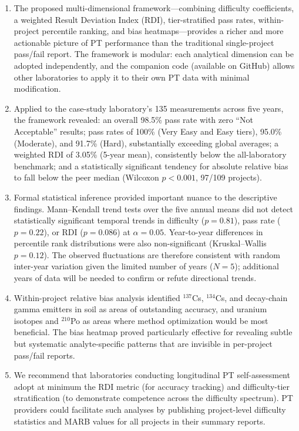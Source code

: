 \documentclass[12pt,a4paper,twoside]{article}
\begin{document}
\begin{enumerate}[nosep,label=(\arabic*)]
  \item The proposed multi-dimensional framework---combining difficulty coefficients, a weighted Result Deviation Index (RDI), tier-stratified pass rates, within-project percentile ranking, and bias heatmaps---provides a richer and more actionable picture of PT performance than the traditional single-project pass/fail report. The framework is modular: each analytical dimension can be adopted independently, and the companion code (available on GitHub) allows other laboratories to apply it to their own PT data with minimal modification.
  \item Applied to the case-study laboratory's 135 measurements across five years, the framework revealed: an overall 98.5\% pass rate with zero ``Not Acceptable'' results; pass rates of 100\% (Very Easy and Easy tiers), 95.0\% (Moderate), and 91.7\% (Hard), substantially exceeding global averages; a weighted RDI of 3.05\% (5-year mean), consistently below the all-laboratory benchmark; and a statistically significant tendency for absolute relative bias to fall below the peer median (Wilcoxon $p < 0.001$, 97/109 projects).
  \item Formal statistical inference provided important nuance to the descriptive findings. Mann--Kendall trend tests over the five annual means did not detect statistically significant temporal trends in difficulty ($p = 0.81$), pass rate ($p = 0.22$), or RDI ($p = 0.086$) at $\alpha = 0.05$. Year-to-year differences in percentile rank distributions were also non-significant (Kruskal--Wallis $p = 0.12$). The observed fluctuations are therefore consistent with random inter-year variation given the limited number of years ($N = 5$); additional years of data will be needed to confirm or refute directional trends.
  \item Within-project relative bias analysis identified $^{137}$Cs, $^{134}$Cs, and decay-chain gamma emitters in soil as areas of outstanding accuracy, and uranium isotopes and $^{210}$Po as areas where method optimization would be most beneficial. The bias heatmap proved particularly effective for revealing subtle but systematic analyte-specific patterns that are invisible in per-project pass/fail reports.
  \item We recommend that laboratories conducting longitudinal PT self-assessment adopt at minimum the RDI metric (for accuracy tracking) and difficulty-tier stratification (to demonstrate competence across the difficulty spectrum). PT providers could facilitate such analyses by publishing project-level difficulty statistics and MARB values for all projects in their summary reports.
\end{enumerate}
\end{document}

